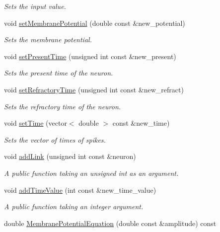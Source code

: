 \begin{DoxyCompactItemize}
\begin{DoxyCompactList}\small\item\em Sets the input value. \end{DoxyCompactList}\item 
void \hyperlink{classNeuron_a5b44817a5923e963314bf8b6fa018635}{set\-Membrane\-Potential} (double const \&new\-\_\-potential)
\begin{DoxyCompactList}\small\item\em Sets the membrane potential. \end{DoxyCompactList}\item 
void \hyperlink{classNeuron_a502684935dbd30fad3c9968943cd292e}{set\-Present\-Time} (unsigned int const \&new\-\_\-present)
\begin{DoxyCompactList}\small\item\em Sets the present time of the neuron. \end{DoxyCompactList}\item 
void \hyperlink{classNeuron_aea0bf060daa71be7088a882802f85dad}{set\-Refractory\-Time} (unsigned int const \&new\-\_\-refract)
\begin{DoxyCompactList}\small\item\em Sets the refractory time of the neuron. \end{DoxyCompactList}\item 
void \hyperlink{classNeuron_a3fd1e5b3fcc9c7a36ab78c330a29e4f8}{set\-Time} (vector$<$ double $>$ const \&new\-\_\-time)
\begin{DoxyCompactList}\small\item\em Sets the vector of times of spikes. \end{DoxyCompactList}\item 
void \hyperlink{classNeuron_a6468e6ea9f34e7ce0414018c0ca52a1c}{add\-Link} (unsigned int const \&neuron)
\begin{DoxyCompactList}\small\item\em A public function taking an unsigned int as an argument. \end{DoxyCompactList}\item 
void \hyperlink{classNeuron_a19391173c3640f1c41ede531574ef9be}{add\-Time\-Value} (int const \&new\-\_\-time\-\_\-value)
\begin{DoxyCompactList}\small\item\em A public function taking an integer argument. \end{DoxyCompactList}\item 
double \hyperlink{classNeuron_a3f673331282b347a4707eb7f8f20c34c}{Membrane\-Potential\-Equation} (double const \&amplitude) const 

\end{DoxyCompactItemize}
